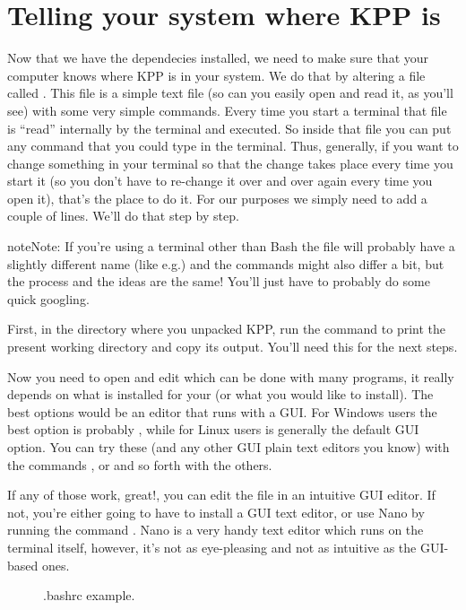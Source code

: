 \documentclass[letterpaper,10pt,openany,oneside]{sphinxmanual}
\begin{document}
\section{Telling your system where KPP is}
\label{compiling:telling-your-system-where-kpp-is}
Now that we have the dependecies installed, we need to make sure that your
computer knows where KPP is in your system. We do that by altering a file
called . This file is a simple text file (so can you easily open and
read it, as you'll see) with some very simple commands. Every time you start a
terminal that file is ``read'' internally by the terminal and executed. So inside
that file you can put any command that you could type in the terminal. Thus,
generally, if you want to change something in your terminal so that the change
takes place every time you start it (so you don't have to re-change it over and
over again every time you open it), that's the place to do it. For our purposes
we simply need to add a couple of lines. We'll do that step by step.

\begin{notice}{note}{Note:}
If you're using a terminal other than Bash the  file will probably
have a slightly different name (like  e.g.) and the commands might
also differ a bit, but the process and the ideas are the same! You'll just have
to probably do some quick googling.
\end{notice}

First, in the directory where you unpacked KPP, run the command  to
print the present working directory and copy its output. You'll need this for
the next steps.

Now you need to open and edit  which can be done with many programs,
it really depends on what is installed for your (or what you would like to
install).  The best options would be an editor that runs with a GUI. For
Windows users the best option is probably , while for Linux users
 is generally the default GUI option. You can try these (and any other
GUI plain text editors you know) with the commands , or
 and so forth with the others.

If any of those work, great!, you can edit the file in an intuitive GUI editor.
If not, you're either going to have to install a GUI text editor, or use Nano
by running the command . Nano is a very handy text editor
which runs on the terminal itself, however, it's not as eye-pleasing and not as
intuitive as the GUI-based ones.
\begin{figure}[htbp]
\centering
\capstart

\noindent{}
\caption{.bashrc example.}\label{compiling:nano-ex}\label{compiling:id1}\end{figure}
\end{document}
